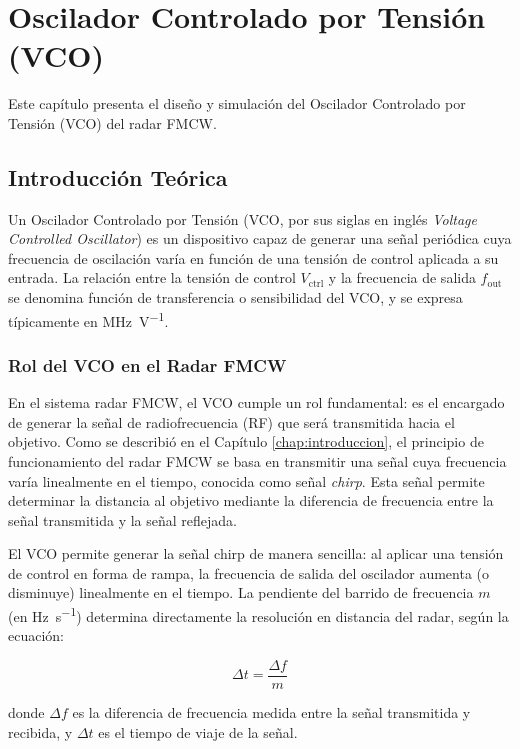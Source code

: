 \chapter{Oscilador Controlado por Tensión (VCO)}
\label{chap:vco}

Este capítulo presenta el diseño y simulación del Oscilador Controlado por Tensión (VCO) del radar FMCW.

\section{Introducción Teórica}

Un Oscilador Controlado por Tensión (VCO, por sus siglas en inglés \textit{Voltage Controlled Oscillator}) es un dispositivo capaz de generar una señal periódica cuya frecuencia de oscilación varía en función de una tensión de control aplicada a su entrada. La relación entre la tensión de control $V_{\text{ctrl}}$ y la frecuencia de salida $f_{\text{out}}$ se denomina función de transferencia o sensibilidad del VCO, y se expresa típicamente en \unit{\MHz\per\V}.

\subsection{Rol del VCO en el Radar FMCW}

En el sistema radar FMCW, el VCO cumple un rol fundamental: es el encargado de generar la señal de radiofrecuencia (RF) que será transmitida hacia el objetivo. Como se describió en el Capítulo \ref{chap:introduccion}, el principio de funcionamiento del radar FMCW se basa en transmitir una señal cuya frecuencia varía linealmente en el tiempo, conocida como señal \textit{chirp}. Esta señal permite determinar la distancia al objetivo mediante la diferencia de frecuencia entre la señal transmitida y la señal reflejada.

El VCO permite generar la señal chirp de manera sencilla: al aplicar una tensión de control en forma de rampa, la frecuencia de salida del oscilador aumenta (o disminuye) linealmente en el tiempo. La pendiente del barrido de frecuencia $m$ (en \unit{\Hz\per\s}) determina directamente la resolución en distancia del radar, según la ecuación:

\begin{equation}
\Delta t = \frac{\Delta f}{m}
\end{equation}

\noindent donde $\Delta f$ es la diferencia de frecuencia medida entre la señal transmitida y recibida, y $\Delta t$ es el tiempo de viaje de la señal.

